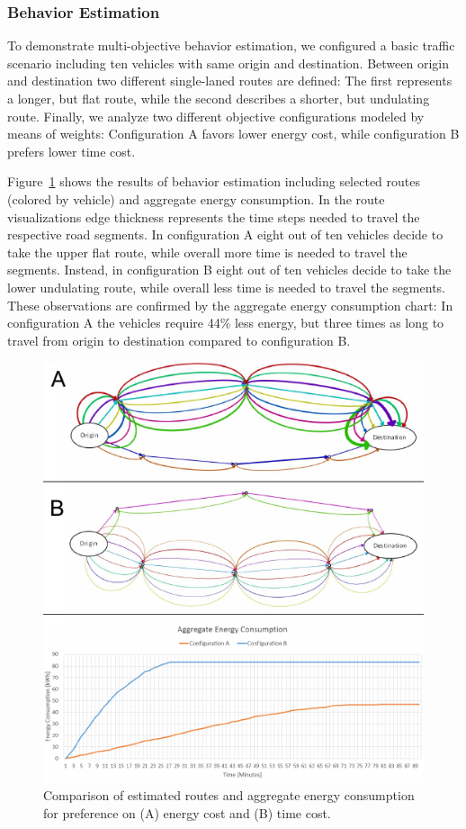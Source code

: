 \documentclass[conference]{../cls/IEEEtran}
\begin{document}
\subsubsection*{Behavior Estimation}

To demonstrate multi-objective behavior estimation, we configured a basic
traffic scenario including ten vehicles with same origin and destination. Between origin and destination two different single-laned routes are defined: The first represents a longer, but flat route, while the second describes a shorter, but undulating route. Finally, we analyze two different objective configurations modeled by means of weights: Configuration A favors lower energy cost, while configuration B prefers lower time cost.

Figure~\ref{figure:results} shows the results of behavior estimation including
selected routes (colored by vehicle) and aggregate energy consumption. In the route visualizations edge thickness represents the time steps needed to travel the respective road segments. In configuration A eight out of ten vehicles decide to take the upper flat route, while overall more time is needed to travel the segments. Instead, in configuration B eight out of ten vehicles decide to take the lower undulating route, while overall less time is needed to travel the segments. These observations are confirmed by the aggregate energy consumption chart: In configuration A the vehicles require 44\% less energy, but three times as long to travel from origin to destination compared to configuration B.

\begin{figure}[t!]
	\includegraphics[width=\columnwidth]{../gfx/results.pdf}
	\caption{Comparison of estimated routes and aggregate energy consumption for preference  on (A) energy cost and (B) time cost.}
	\label{figure:results}
\end{figure}
\end{document}
